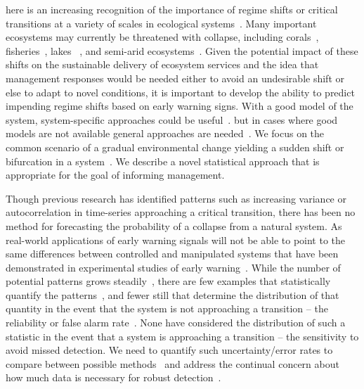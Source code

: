 \documentclass{pnastwo}
\begin{document}
\begin{article}
here is an increasing recognition of the importance of regime shifts or critical transitions at a variety of scales in ecological systems~\cite{Holling1973, Wissel1984, Scheffer2001, Scheffer2009, Drake2010, Carpenter2011}⁠. 
Many important ecosystems may currently be threatened with collapse, including corals~\cite{Bellwood2004}, fisheries~\cite{Berkes2006}⁠, lakes~\cite{Carpenter2011} , and semi-arid ecosystems~\cite{Kefi2007}⁠. 
Given the potential impact of  these shifts on the sustainable delivery of ecosystem services
and the idea that management responses would be needed either to avoid an undesirable shift or else to adapt to novel conditions,
it is important to develop the ability to predict impending regime shifts based on early warning signs. 
With a good model of the system, system-specific approaches could be useful~\cite{Lenton2009}.
but in cases where good models are not available general approaches are needed~\cite{Scheffer2009}⁠.
We focus on the common scenario of a gradual environmental change yielding a sudden shift or bifurcation in a system~\cite{Scheffer2001, Scheffer2009}.
We describe a novel statistical approach that is appropriate for the goal of informing management.  

Though previous research has identified patterns such as increasing variance or autocorrelation in time-series approaching a critical transition,
there has been no method for forecasting the probability of a collapse from a natural system.
As real-world applications of early warning signals will not be able to point to the same differences between controlled and
manipulated systems that have been demonstrated in experimental studies of early warning~\cite{Drake2010, Carpenter2011}⁠.
While the number of potential patterns grows steadily~\cite{Carpenter2006, Dakos2008, Guttal2008, Guttal2008a, Dakos2011}, %
there are few examples that statistically quantify the patterns~\cite{Dakos2008, Dakos2011},⁠
and fewer still that determine the distribution of that quantity in the event that the system is not approaching a transition --
the reliability or false alarm rate~\cite{Dakos2008}⁠. 
None have considered the distribution of such a statistic in the event that a system is approaching a transition -- 
the sensitivity to avoid missed detection.  
We need to quantify such uncertainty/error rates to compare between possible methods~\cite{Contamin2009}
and address the continual concern about how much data is necessary⁠ for robust detection~\cite{Scheffer2001, Dakos2008, Carpenter2011, Scheffer2010, Inman2011}.  


\end{article}
\end{document}
